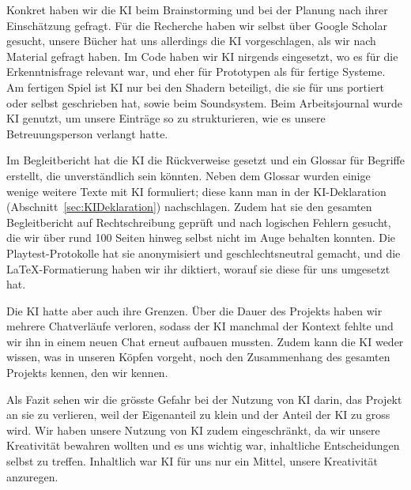 \documentclass[../Main.tex]{subfiles}
\begin{document}
Konkret haben wir die KI beim Brainstorming und bei der Planung nach ihrer Einschätzung gefragt. Für die Recherche haben wir selbst über Google Scholar gesucht, unsere Bücher hat uns allerdings die KI vorgeschlagen, als wir nach Material gefragt haben. Im Code haben wir KI nirgends eingesetzt, wo es für die Erkenntnisfrage relevant war, und eher für Prototypen als für fertige Systeme. Am fertigen Spiel ist KI nur bei den Shadern beteiligt, die sie für uns portiert oder selbst geschrieben hat, sowie beim Soundsystem. Beim Arbeitsjournal wurde KI genutzt, um unsere Einträge so zu strukturieren, wie es unsere Betreuungsperson verlangt hatte.

Im Begleitbericht hat die KI die Rückverweise gesetzt und ein Glossar für Begriffe erstellt, die unverständlich sein könnten. Neben dem Glossar wurden einige wenige weitere Texte mit KI formuliert; diese kann man in der KI-Deklaration (Abschnitt~\ref{sec:KIDeklaration}) nachschlagen. Zudem hat sie den gesamten Begleitbericht auf Rechtschreibung geprüft und nach logischen Fehlern gesucht, die wir über rund 100 Seiten hinweg selbst nicht im Auge behalten konnten. Die Playtest-Protokolle hat sie anonymisiert und geschlechtsneutral gemacht, und die \LaTeX-Formatierung haben wir ihr diktiert, worauf sie diese für uns umgesetzt hat.

Die KI hatte aber auch ihre Grenzen. Über die Dauer des Projekts haben wir mehrere Chatverläufe verloren, sodass der KI manchmal der Kontext fehlte und wir ihn in einem neuen Chat erneut aufbauen mussten. Zudem kann die KI weder wissen, was in unseren Köpfen vorgeht, noch den Zusammenhang des gesamten Projekts kennen, den wir kennen.

Als Fazit sehen wir die grösste Gefahr bei der Nutzung von KI darin, das Projekt an sie zu verlieren, weil der Eigenanteil zu klein und der Anteil der KI zu gross wird. Wir haben unsere Nutzung von KI zudem eingeschränkt, da wir unsere Kreativität bewahren wollten und es uns wichtig war, inhaltliche Entscheidungen selbst zu treffen. Inhaltlich war KI für uns nur ein Mittel, unsere Kreativität anzuregen.
\end{document}
